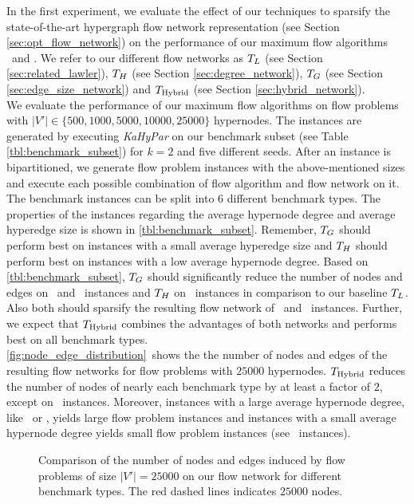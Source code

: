 In the first experiment, we evaluate the effect of our techniques to sparsify
the state-of-the-art hypergraph flow network representation (see Section \ref{sec:opt_flow_network})
on the performance of our maximum flow algorithms \GoldbergTarjan~and \EdmondKarp. 
We refer to our different flow networks as $T_L$ (see Section \ref{sec:related_lawler}), $T_H$ (see Section 
\ref{sec:degree_network}), $T_G$ (see Section \ref{sec:edge_size_network})
and $T_{\text{Hybrid}}$ (see Section \ref{sec:hybrid_network}). \\
We evaluate the performance of our maximum flow algorithms on flow problems with
$|V'| \in \{500,1000,5000,10000,25000\}$ hypernodes. The instances are generated by executing
\emph{KaHyPar} on our benchmark subset (see Table \ref{tbl:benchmark_subset}) for $k = 2$ and five different 
seeds. After an instance is bipartitioned, we generate flow problem instances
with the above-mentioned sizes and execute each possible combination of flow algorithm and
flow network on it. \\
The benchmark instances can be split into $6$ different benchmark types. The properties of the instances
regarding the average hypernode degree and average hyperedge size is shown in \autoref{tbl:benchmark_subset}.
Remember, $T_G$ should perform best on instances with a small average hyperedge size and
$T_H$ should perform best on instances with a low average hypernode degree. Based on 
\autoref{tbl:benchmark_subset}, $T_G$ should significantly reduce the number of
nodes and edges on \Primal~and \Literal~instances and $T_H$ on \Dual~instances in
comparison to our baseline $T_L$. Also both should sparsify the resulting flow network
of \ISPD~and \DAC~instances. Further, we expect that $T_{\text{Hybrid}}$ combines the advantages of
both networks and performs best on all benchmark types.\\
\autoref{fig:node_edge_distribution}~shows the the number of nodes and edges
of the resulting flow networks for flow problems with $25000$ hypernodes.
$T_{\text{Hybrid}}$ reduces the number of nodes of nearly each benchmark type 
by at least a factor of $2$, except on \SPM~instances. Moreover, instances 
with a large average hypernode degree, like \Primal~or \Literal, yields large flow problem 
instances and instances with a small average hypernode degree yields small flow problem
instances (see \Dual~instances).\\
\begin{figure}[ht!]
\centering
\caption{Comparison of the number of nodes and edges induced by flow problems 
         of size $|V'| = 25000$ on our flow network for different benchmark types.
         The red dashed lines indicates $25000$ nodes.}
\label{fig:node_edge_distribution}
\end{figure} 
